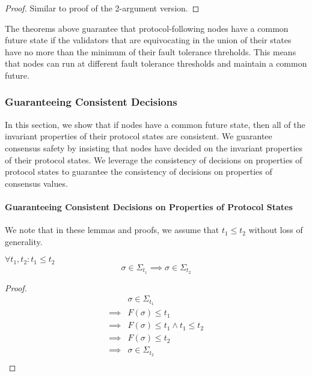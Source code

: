\begin{proof}
Similar to proof of the 2-argument version.
\end{proof}

The theorems above guarantee that protocol-following nodes have a common future state if the validators that are equivocating in the union of their states have no more than the minimum of their fault tolerance threholds. This means that nodes can run at different fault tolerance thresholds and maintain a common future.

\subsubsection{Guaranteeing Consistent Decisions}

In this section, we show that if nodes have a common future state, then all of the invariant properties of their protocol states are consistent. We guarantee consensus safety by insisting that nodes have decided on the invariant properties of their protocol states. We leverage the consistency of decisions on properties of protocol states to guarantee the consistency of decisions on properties of consensus values.

\paragraph{Guaranteeing Consistent Decisions on Properties of Protocol States}

We note that in these lemmas and proofs, we assume that $t_1 \leq t_2$ without loss of generality.

\begin{lemma}
$\forall t_1, t_2 : t_1 \leq t_2$
$$
\sigma \in \Sigma_{t_1} \implies \sigma \in \Sigma_{t_2}
$$
\end{lemma}

\begin{proof}
\begin{align}
        &\sigma \in \Sigma_{t_1} \\
\implies&F(\sigma) \leq t_1 \\
\implies&F(\sigma) \leq t_1 \land t_1 \leq t_2\\
\implies&F(\sigma) \leq t_2 \\
\implies&\sigma \in \Sigma_{t_2} \\
\end{align}
\end{proof}

